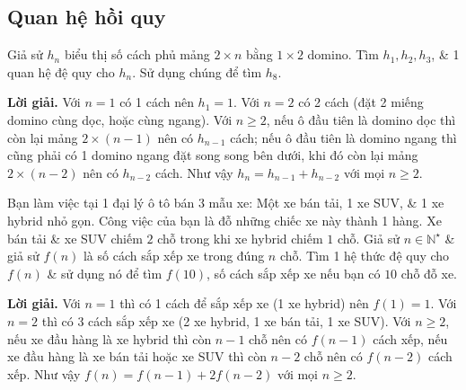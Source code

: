 \subsection{Quan hệ hồi quy}

\begin{tcolorbox}[breakable]
    \begin{baitoan}\label{pb:w08:34}
        Giả sử $h_n$ biểu thị số cách phủ mảng $2\times n$ bằng $1\times 2$ domino. Tìm $h_1,h_2,h_3$, \& 1 quan hệ đệ quy cho $h_n$. Sử dụng chúng để tìm $h_8$.
    \end{baitoan}
\end{tcolorbox}

\textbf{Lời giải. }Với $n = 1$ có 1 cách nên $h_1=1$. Với $n=2$ có 2 cách (đặt 2 miếng domino cùng dọc, hoặc cùng ngang). Với $n\geq 2$, nếu ô đầu tiên là domino dọc thì còn lại mảng $2 \times (n-1)$ nên có $h_{n-1}$ cách; nếu ô đầu tiên là domino ngang thì cũng phải có 1 domino ngang đặt song song bên dưới, khi đó còn lại mảng $2\times (n-2)$ nên có $h_{n-2}$ cách. Như vậy $h_n = h_{n-1} + h_{n-2}$ với mọi $n \geq 2$.

\begin{tcolorbox}[breakable]
    \begin{baitoan}\label{pb:w08:35}
        Bạn làm việc tại 1 đại lý ô tô bán $3$ mẫu xe: Một xe bán tải, 1 xe SUV, \& 1 xe hybrid nhỏ gọn. Công việc của bạn là đỗ những chiếc xe này thành 1 hàng. Xe bán tải \& xe SUV chiếm $2$ chỗ trong khi xe hybrid chiếm $1$ chỗ. Giả sử $n\in\mathbb{N}^\star$ \& giả sử $f(n)$ là số cách sắp xếp xe trong đúng $n$ chỗ. Tìm 1 hệ thức đệ quy cho $f(n)$ \& sử dụng nó để tìm $f(10)$, số cách sắp xếp xe nếu bạn có $10$ chỗ đỗ xe.
    \end{baitoan}
\end{tcolorbox}

\textbf{Lời giải. }Với $n=1$ thì có 1 cách để sắp xếp xe (1 xe hybrid) nên $f(1) = 1$. Với $n=2$ thì có 3 cách sắp xếp xe (2 xe hybrid, 1 xe bán tải, 1 xe SUV). Với $n \ge 2$, nếu xe đầu hàng là xe hybrid thì còn $n-1$ chỗ nên có $f(n-1)$ cách xếp, nếu xe đầu hàng là xe bán tải hoặc xe SUV thì còn $n-2$ chỗ nên có $f(n-2)$ cách xếp. Như vậy $f(n) = f(n-1) + 2f(n-2)$ với mọi $n \geq 2$.

